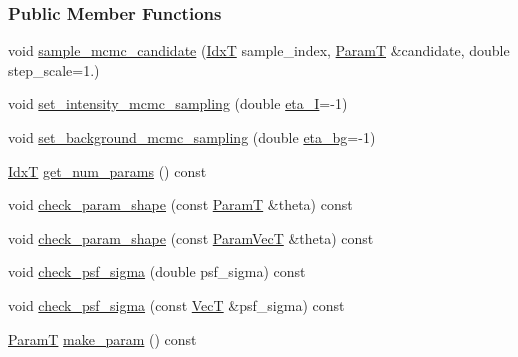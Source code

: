 \subsubsection*{Public Member Functions}
\begin{DoxyCompactItemize}
\item 
void \hyperlink{classmappel_1_1MCMCAdaptor1Ds_a27673f909d9f70eff58c9d7616311333}{sample\+\_\+mcmc\+\_\+candidate} (\hyperlink{namespacemappel_ab17ec0f30b61ece292439d7ece81d3a8}{IdxT} sample\+\_\+index, \hyperlink{classmappel_1_1PointEmitterModel_a665ec6aea3aac139bb69a23c06d4b9a1}{ParamT} \&candidate, double step\+\_\+scale=1.)
\item 
void \hyperlink{classmappel_1_1MCMCAdaptor1D_ac70f768928859b1e9449b0ec1a141c4c}{set\+\_\+intensity\+\_\+mcmc\+\_\+sampling} (double \hyperlink{classmappel_1_1MCMCAdaptor1D_a5780d326be0c40e10d6c91777cfffbd3}{eta\+\_\+I}=-\/1)
\item 
void \hyperlink{classmappel_1_1MCMCAdaptor1D_ae79ee3845fbdd0e378f00eeebf8ccef1}{set\+\_\+background\+\_\+mcmc\+\_\+sampling} (double \hyperlink{classmappel_1_1MCMCAdaptor1D_af54c93421b8e298289cbb92743c6b3d5}{eta\+\_\+bg}=-\/1)
\item 
\hyperlink{namespacemappel_ab17ec0f30b61ece292439d7ece81d3a8}{IdxT} \hyperlink{classmappel_1_1PointEmitterModel_a6fe8129bd24ab5c6620b3ab106b6c91a}{get\+\_\+num\+\_\+params} () const 
\item 
void \hyperlink{classmappel_1_1PointEmitterModel_a97a868e842302f670ed9f9bd49416771}{check\+\_\+param\+\_\+shape} (const \hyperlink{classmappel_1_1PointEmitterModel_a665ec6aea3aac139bb69a23c06d4b9a1}{ParamT} \&theta) const 
\item 
void \hyperlink{classmappel_1_1PointEmitterModel_a54b341a9bc0e32e2c8bbfe4ec0d8c9a1}{check\+\_\+param\+\_\+shape} (const \hyperlink{classmappel_1_1PointEmitterModel_add253b568d763f1513a810aac35de719}{Param\+VecT} \&theta) const 
\item 
void \hyperlink{classmappel_1_1PointEmitterModel_a01ce8d6358acbd2575be519dff1df89b}{check\+\_\+psf\+\_\+sigma} (double psf\+\_\+sigma) const 
\item 
void \hyperlink{classmappel_1_1PointEmitterModel_a85780ca544a5ef5e0a62e74005081677}{check\+\_\+psf\+\_\+sigma} (const \hyperlink{namespacemappel_a2225ad69f358daa3f4f99282a35b9a3a}{VecT} \&psf\+\_\+sigma) const 
\item 
\hyperlink{classmappel_1_1PointEmitterModel_a665ec6aea3aac139bb69a23c06d4b9a1}{ParamT} \hyperlink{classmappel_1_1PointEmitterModel_a1cd8ff64ce4132b6eaa8655696885749}{make\+\_\+param} () const 

\end{DoxyCompactItemize}
